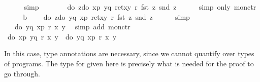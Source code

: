 \begin{isabellebody}
\ \ \ \ \isamarkupfalse%
\ simp\isanewline
\ \ \isamarkupfalse%
\ \isamarkupfalse%
\ {\isachardoublequote}{\isasymdots}\ {\isacharequal}\ do\ {\isacharbraceleft}z{\isasymleftarrow}do\ {\isacharbraceleft}x{\isasymleftarrow}p{\isacharsemicolon}\ y{\isasymleftarrow}q{\isacharsemicolon}\ ret{\isacharparenleft}x{\isacharcomma}y{\isacharparenright}{\isacharbraceright}{\isacharsemicolon}\ r\ {\isacharparenleft}fst\ z{\isacharparenright}\ {\isacharparenleft}snd\ z{\isacharparenright}{\isacharbraceright}{\isachardoublequote}\isanewline
\ \ \ \ \isamarkupfalse%
\ {\isacharparenleft}simp\ only{\isacharcolon}\ mon{\isacharunderscore}ctr{\isacharparenright}\isanewline
\ \ \isamarkupfalse%
\ \isamarkupfalse%
\ b\ \isamarkupfalse%
\ {\isachardoublequote}{\isasymdots}\ {\isacharequal}\ do\ {\isacharbraceleft}z{\isasymleftarrow}do\ {\isacharbraceleft}y{\isasymleftarrow}q{\isacharsemicolon}\ x{\isasymleftarrow}p{\isacharsemicolon}\ ret{\isacharparenleft}x{\isacharcomma}y{\isacharparenright}{\isacharbraceright}{\isacharsemicolon}\ r\ {\isacharparenleft}fst\ z{\isacharparenright}\ {\isacharparenleft}snd\ z{\isacharparenright}{\isacharbraceright}{\isachardoublequote}\isanewline
\ \ \ \ \isamarkupfalse%
\ simp\isanewline
\ \ \isamarkupfalse%
\ \isamarkupfalse%
\ {\isachardoublequote}{\isasymdots}\ {\isacharequal}\ do\ {\isacharbraceleft}y{\isasymleftarrow}q{\isacharsemicolon}\ x{\isasymleftarrow}p{\isacharsemicolon}\ r\ x\ y{\isacharbraceright}{\isachardoublequote}\ \isamarkupfalse%
\ {\isacharparenleft}simp\ add{\isacharcolon}\ mon{\isacharunderscore}ctr{\isacharparenright}\isanewline
\ \ \isamarkupfalse%
\ \isamarkupfalse%
\ {\isachardoublequote}do\ {\isacharbraceleft}x{\isasymleftarrow}p{\isacharsemicolon}\ y{\isasymleftarrow}q{\isacharsemicolon}\ r\ x\ y{\isacharbraceright}\ {\isacharequal}\ do\ {\isacharbraceleft}y{\isasymleftarrow}q{\isacharsemicolon}\ x{\isasymleftarrow}p{\isacharsemicolon}\ r\ x\ y{\isacharbraceright}{\isachardoublequote}\ \isamarkupfalse%
\isacommand{{\isachardot}}\isanewline
\isamarkupfalse%
\isanewline
\isamarkupfalse%
\isamarkupfalse%
\isamarkupfalse%
%
\begin{isamarkuptext}%
In this case, type annotations are necessary, since we cannot
  quantify over types of programs. The type for  given here
  is precisely what is needed for the proof to go through.
  \label{isa:commute-3-1}%

\end{isamarkuptext}
\end{isabellebody}
